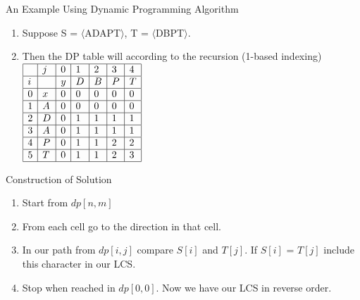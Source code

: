 \documentclass{beamer}
\begin{document}
\begin{frame}{An Example Using Dynamic Programming Algorithm}
\begin{enumerate}
    \onslide \item<1-> Suppose S = $\langle$ADAPT$\rangle$, T = $\langle$DBPT$\rangle$.
    \onslide \item<2-> Then the DP table will according to the recursion (1-based indexing)\\
    \centering
    $
    \begin{array}{ | l | l | l | l | l | l | l | }
    \hline
	    & j & 0 & 1 & 2 & 3 & 4 \\ \hline
	    i &  & y & D & B & P & T \\ \hline
	    0 & x & 0 & 0 & 0 & 0 & 0 \\ \hline
	    1 & A & 0 & 0 & 0 & 0 & 0 \\ \hline
	    2 & D & 0 & 1 & 1 & 1 & 1 \\ \hline
	    3 & A & 0 & 1 & 1 & 1 & 1 \\ \hline
	    4 & P & 0 & 1 & 1 & 2 & 2 \\ \hline
	    5 & T & 0 & 1 & 1 & 2 & 3 \\ \hline
    \end{array}
    $
\end{enumerate}

\end{frame}





\begin{frame}{Construction of Solution}
 \begin{enumerate}
     \onslide\item<1-> Start from $dp[n,m]$ 
     \onslide\item<2-> From each cell go to the direction in that cell.
     \onslide\item<3-> In our path from $dp[i,j]$ compare $S[i]$ and $T[j]$. If $S[i]$ = $T[j]$ include this character in our LCS. \onslide\item<4-> Stop when reached in $dp[0,0]$. Now we have our LCS in reverse order. 
  \end{enumerate}
 \end{frame}
\end{document}
